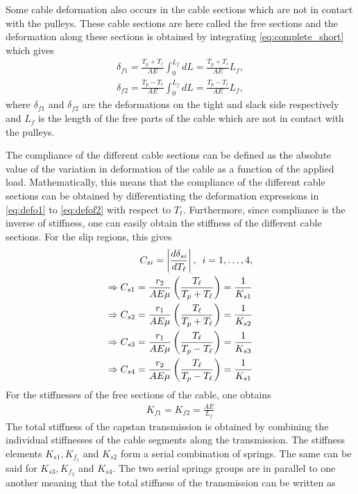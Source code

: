 \documentclass[twocolumn,10pt]{asme2ej}
\newcommand{\hquad}{\hspace{0.5em}}
\begin{document}
Some cable deformation also occurs in the cable sections which are not in contact with the pulleys. These cable sections are here called the free sections and the deformation along these sections is obtained by integrating \eqref{eq:complete_short} which gives
\begin{align}
\delta_{f1} = \frac{T_p+T_\ell}{AE}\int_0^{L_f}dL=\frac{T_p+T_\ell}{AE}L_f,\label{eq:defof1}\\
\delta_{f2}=\frac{T_p-T_\ell}{AE}\int_0^{L_f}dL=\frac{T_p-T_\ell}{AE}L_f,\label{eq:defof2}
\end{align}
where $\delta_{f1}$ and $\delta_{f2}$ are the deformations on the tight and slack side respectively and $L_f$ is the length of the free parts of the cable which are not in contact with the pulleys.
\par
 The compliance of the different cable sections can be defined as the absolute value of the variation in deformation of the cable as a function of the applied load. Mathematically, this means that the compliance of the different cable sections can be obtained by differentiating the deformation expressions in \eqref{eq:defo1} to \eqref{eq:defof2} with respect to $T_\ell$. Furthermore, since compliance is the inverse of stiffness, one can easily obtain the stiffness of the different cable sections. For the slip regions, this gives
 \begin{align}
     C_{si}=\left|\frac{d\delta_{si}}{dT_\ell}\right|,\hquad i = 1,\ldots ,4,\label{eq:simple_stiff_1}\\
     \Rightarrow C_{s1} = \frac{r_2}{AE\mu}\left(\frac{T_\ell}{T_p+T_\ell}\right) = \frac{1}{K_{s1}}\\
     \Rightarrow C_{s2} = \frac{r_1}{AE\mu}\left(\frac{T_\ell}{T_p+T_\ell}\right)= \frac{1}{K_{s2}}\\
     \Rightarrow C_{s3} =
     \frac{r_1}{AE\mu}\left(\frac{T_\ell}{T_p-T_\ell}\right)= \frac{1}{K_{s3}}\\
     \Rightarrow C_{s4} =
     \frac{r_2}{AE\mu}\left(\frac{T_\ell}{T_p-T_\ell}\right)= \frac{1}{K_{s1}}\label{eq:simple_stiff_4}
 \end{align}
 For the stiffnesses of the free sections of the cable, one obtains
 \begin{align}
     K_{f1}=K_{f2}=\frac{AE}{L_f}
 \end{align}
 The total stiffness of the capstan transmission is obtained by combining the individual stiffnesses of the cable segments along the transmission. The stiffness elements $K_{s1},K_{f_1}$ and $K_{s2}$ form a serial combination of springs. The same can be said for $K_{s3},K_{f_2}$ and $K_{s4}$. The two serial springs groups are in parallel to one another meaning that the total stiffness of the transmission can be written as 
\end{document}
